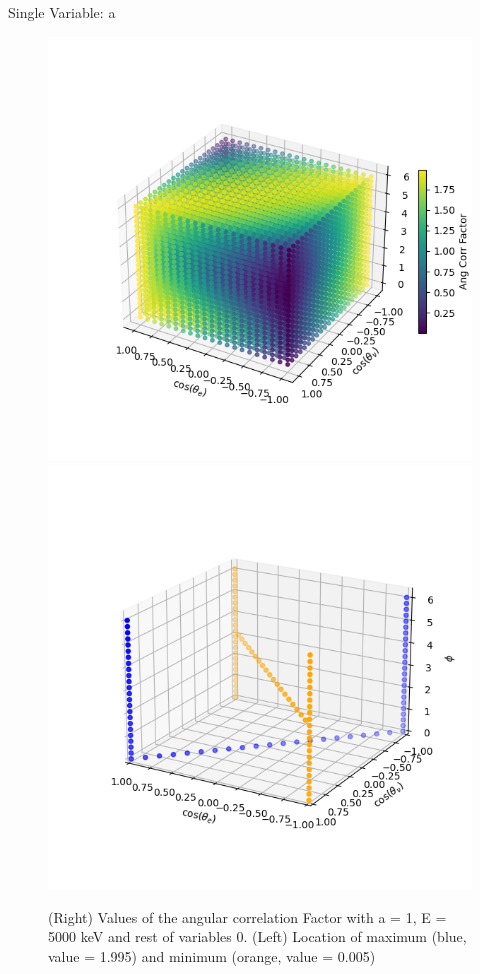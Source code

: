 \documentclass{beamer}
\begin{document}
\begin{frame}{Single Variable: a}
	\begin{figure}
		\centering
		\includegraphics[width=0.4\paperwidth]{plots/a_3D_image.png}
		\includegraphics[width=0.4\paperwidth]{plots/a_max_min.png}
		\caption{(Right) Values of the angular correlation Factor with a = 1, E = 5000 keV and rest of variables 0. (Left) Location of maximum (blue, value = 1.995) and minimum (orange, value = 0.005)}	
	\end{figure}
\end{frame}
\end{document}
